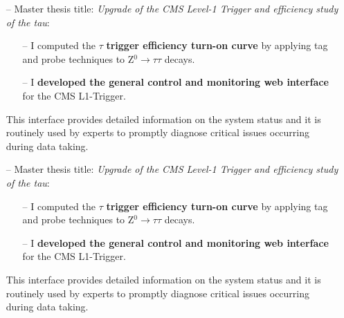 \documentclass[10pt,a4paper]{altacv}
\begin{document}
\medskip


\begin{itemize}
    \setlength{\itemindent}{0.5em}
    \item[--]   \small{Master thesis title: \textit{Upgrade of the CMS Level-1 Trigger and efficiency study of the tau}}:
    \begin{itemize}
    \item[--]   \small{I computed the $\tau$ \textbf{trigger efficiency turn-on curve} by applying tag and probe techniques to Z$^0\to\tau\tau$ decays. }
    \item[--]   \small{I \textbf{developed the general control and monitoring web interface} for the CMS L1-Trigger. }
    \end{itemize}
    This interface provides detailed information on the system status and it is routinely used by experts to promptly diagnose critical issues occurring during data taking.
\end{itemize}

\medskip


\begin{itemize}
    \setlength{\itemindent}{0.5em}
    \item[--]   \small{Master thesis title: \textit{Upgrade of the CMS Level-1 Trigger and efficiency study of the tau}}:
    \begin{itemize}
    \item[--]   \small{I computed the $\tau$ \textbf{trigger efficiency turn-on curve} by applying tag and probe techniques to Z$^0\to\tau\tau$ decays. }
    \item[--]   \small{I \textbf{developed the general control and monitoring web interface} for the CMS L1-Trigger. }
    \end{itemize}
    This interface provides detailed information on the system status and it is routinely used by experts to promptly diagnose critical issues occurring during data taking.
\end{itemize}



\end{document}
